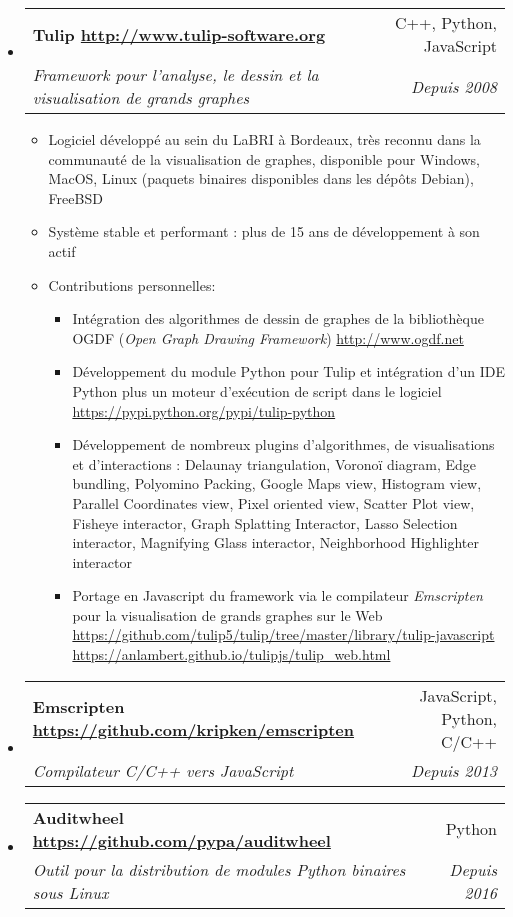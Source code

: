 \documentclass[letterpaper,11pt]{article}
\makeatletter
\newcommand{\ressubheading}[4]{
\begin{tabular*}{6.5in}{l@{\cftdotfill{\cftsecdotsep}\extracolsep{\fill}}r}
    \textbf{#1} & #2 \\
    \textit{#3} & \textit{#4} \\
\end{tabular*}\vspace{-6pt}}
\makeatother
\begin{document}
\begin{itemize}

\item \ressubheading{Tulip \url{http://www.tulip-software.org}}{C++, Python, JavaScript}{Framework pour l'analyse, le dessin et la visualisation de grands graphes}{Depuis 2008}

\begin{itemize}
  \item Logiciel développé au sein du LaBRI à Bordeaux, très reconnu dans la communauté de la visualisation de graphes, disponible pour Windows, MacOS, Linux (paquets binaires disponibles dans les dépôts Debian), FreeBSD
  \item Système stable et performant : plus de 15 ans de développement à son actif
  \item Contributions personnelles:
  \begin{itemize}
    \item Intégration des algorithmes de dessin de graphes de la bibliothèque OGDF (\emph{Open Graph Drawing Framework}) \url{http://www.ogdf.net}
    \item Développement du module Python pour Tulip et intégration d'un IDE Python plus un moteur d'exécution de script dans le logiciel \url{https://pypi.python.org/pypi/tulip-python}
    \item Développement de nombreux plugins d'algorithmes, de visualisations et d'interactions : Delaunay triangulation, Voronoï diagram, Edge bundling, Polyomino Packing, Google Maps view, Histogram view, Parallel Coordinates view, Pixel oriented view, Scatter Plot view, Fisheye interactor, Graph Splatting Interactor, Lasso Selection interactor, Magnifying Glass interactor, Neighborhood Highlighter interactor
    \item Portage en Javascript du framework via le compilateur \emph{Emscripten} pour la visualisation de grands graphes sur le Web \url{https://github.com/tulip5/tulip/tree/master/library/tulip-javascript} \url{https://anlambert.github.io/tulipjs/tulip_web.html}
  \end{itemize}
\end{itemize}

\item \ressubheading{Emscripten \url{https://github.com/kripken/emscripten}}{JavaScript, Python, C/C++}{Compilateur C/C++ vers JavaScript}{Depuis 2013}

\item \ressubheading{Auditwheel \url{https://github.com/pypa/auditwheel}}{Python}{Outil pour la distribution de modules Python binaires sous Linux}{Depuis 2016}

\end{itemize}
\end{document}
